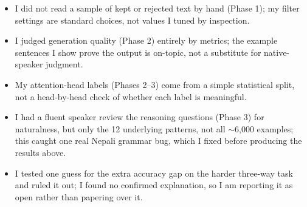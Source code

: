 \documentclass[11pt]{article}
\begin{document}
\begin{itemize}
\item I did not read a sample of kept or rejected text by hand (Phase 1); my filter settings are standard choices, not values I tuned by inspection.
\item I judged generation quality (Phase 2) entirely by metrics; the example sentences I show prove the output is on-topic, not a substitute for native-speaker judgment.
\item My attention-head labels (Phases 2--3) come from a simple statistical split, not a head-by-head check of whether each label is meaningful.
\item I had a fluent speaker review the reasoning questions (Phase 3) for naturalness, but only the 12 underlying patterns, not all $\sim$6,000 examples; this caught one real Nepali grammar bug, which I fixed before producing the results above.
\item I tested one guess for the extra accuracy gap on the harder three-way task and ruled it out; I found no confirmed explanation, so I am reporting it as open rather than papering over it.
\end{itemize}
\end{document}
